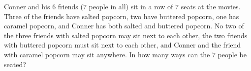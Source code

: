 Conner and his $6$ friends ($7$ people in all) sit in a row of $7$ seats at the movies. Three of the friends have salted popcorn, two have buttered popcorn, one has caramel popcorn, and Conner has both salted and buttered popcorn. No two of the three friends with salted popcorn may sit next to each other, the two friends with buttered popcorn must sit next to each other, and Conner and the friend with caramel popcorn may sit anywhere. In how many ways can the $7$ people be seated?
